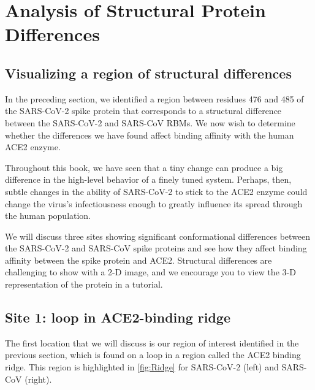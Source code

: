 \FloatBarrier
{}

\section{Analysis of Structural Protein Differences}
\label{sec:structural_differences}
\subsection{Visualizing a region of structural differences}

In the preceding section, we identified a region between residues 476 and 485 of the SARS-CoV-2 spike protein that corresponds to a structural difference between the SARS-CoV-2 and SARS-CoV RBMs. We now wish to determine whether the differences we have found affect binding affinity with the human ACE2 enzyme.

Throughout this book, we have seen that a tiny change can produce a big difference in the high-level behavior of a finely tuned system. Perhaps, then, subtle changes in the ability of SARS-CoV-2 to stick to the ACE2 enzyme could change the virus's infectiousness enough to greatly influence its spread through the human population.

We will discuss three sites showing significant conformational differences between the SARS-CoV-2 and SARS-CoV spike proteins and see how they affect binding affinity between the spike protein and ACE2. Structural differences are challenging to show with a 2-D image, and we encourage you to view the 3-D representation of the protein in a tutorial.\\

\FloatBarrier
{}
\subsection{Site 1: loop in ACE2-binding ridge}

The first location that we will discuss is our region of interest identified in the previous section, which is found on a loop in a region called the ACE2 binding ridge. This region is highlighted in \autoref{fig:Ridge} for SARS-CoV-2 (left) and SARS-CoV (right).\\

